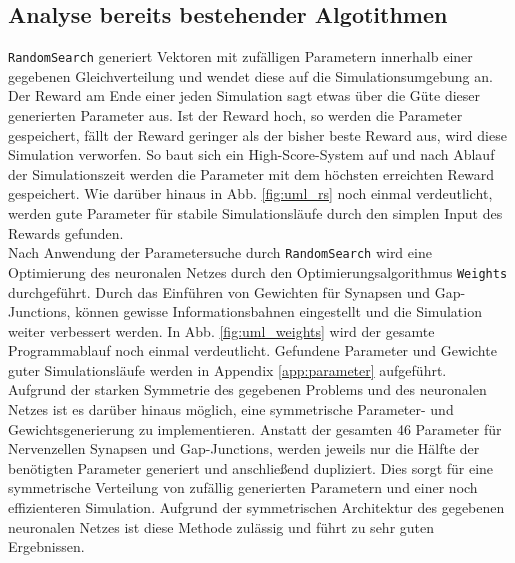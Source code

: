 	\subsection{Analyse bereits bestehender Algotithmen}
		\texttt{RandomSearch} generiert Vektoren mit zufälligen Parametern innerhalb einer gegebenen Gleichverteilung und wendet diese auf die Simulationsumgebung an. Der Reward am Ende einer jeden Simulation sagt etwas über die Güte dieser generierten Parameter aus. Ist der Reward hoch, so werden die Parameter gespeichert, fällt der Reward geringer als der bisher beste Reward aus, wird diese Simulation verworfen. So baut sich ein High-Score-System auf und nach Ablauf der Simulationszeit werden die Parameter mit dem höchsten erreichten Reward gespeichert.	Wie darüber hinaus in Abb. \ref{fig:uml_rs} noch einmal verdeutlicht, werden gute Parameter für stabile Simulationsläufe durch den simplen Input des Rewards gefunden.\\
		Nach Anwendung der Parametersuche durch \texttt{RandomSearch} wird eine Optimierung des neuronalen Netzes durch den Optimierungsalgorithmus \texttt{Weights} durchgeführt. Durch das Einführen von Gewichten für Synapsen und Gap-Junctions, können gewisse Informationsbahnen eingestellt und die Simulation weiter verbessert werden. In Abb. \ref{fig:uml_weights} wird der gesamte Programmablauf noch einmal verdeutlicht.	Gefundene Parameter und Gewichte guter Simulationsläufe werden in Appendix \ref{app:parameter} aufgeführt.\\
		Aufgrund der starken Symmetrie des gegebenen Problems und des neuronalen Netzes ist es darüber hinaus möglich, eine symmetrische Parameter- und Gewichtsgenerierung zu implementieren. Anstatt der gesamten 46 Parameter für Nervenzellen Synapsen und Gap-Junctions, werden jeweils nur die Hälfte der benötigten Parameter generiert und anschließend dupliziert. Dies sorgt für eine symmetrische Verteilung von zufällig generierten Parametern und einer noch effizienteren Simulation. Aufgrund der symmetrischen Architektur des gegebenen neuronalen Netzes ist diese Methode zulässig und führt zu sehr guten Ergebnissen.
